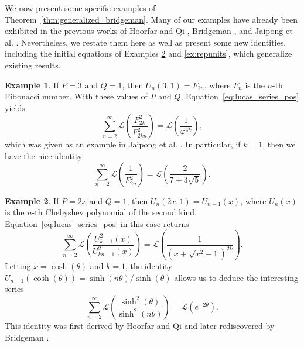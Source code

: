 \documentclass[10pt]{article}
\theoremstyle{definition}
\newtheorem{example}{Example}
\begin{document}
We now present some specific examples of Theorem~\ref{thm:generalized_bridgeman}.  Many of our examples have already been exhibited in the previous works of Hoorfar and Qi \cite{hoorfar2009sums}, Bridgeman \cite{bridgeman2021dilogarithm}, and Jaipong et al. \cite{jaipong2023}.  Nevertheless, we restate them here as well as present some new identities, including the initial equations of Examples \ref{ex:chebyshev} and \ref{ex:repunits}, which generalize existing results. 
\begin{example}\label{ex:lucas_pos_fib}
If $P=3$ and $Q=1$, then $U_n(3,1) = F_{2n}$, where $F_{n}$ is the $n$-th Fibonacci number.  With these values of $P$ and $Q$, Equation~\eqref{eq:lucas_series_pos} yields
\begin{equation*}
    \sum_{n=2}^{\infty}\mathcal{L}\left(\frac{F^2_{2k}}{F^2_{2kn}}\right)  = \mathcal{L}\left(\frac{1}{\varphi^{4k}}\right),
\end{equation*}
which was given as an example in Jaipong et al. \cite{jaipong2023}.  In particular, if $k = 1$, then we have the nice identity
\begin{equation*}
    \sum_{n=2}^{\infty}\mathcal{L}\left(\frac{1}{F^2_{2n}}\right)  = \mathcal{L}\left(\frac{2}{7+3\sqrt{5}}\right).
\end{equation*}
\end{example}
\begin{example}\label{ex:chebyshev}
If $P=2x$ and $Q=1$, then $U_n(2x,1) = U_{n-1}(x)$, where $U_{n}(x)$ is the $n$-th Chebyshev polynomial of the second kind.  Equation~\eqref{eq:lucas_series_pos} in this case returns
\begin{equation*}
    \sum_{n=2}^{\infty}\mathcal{L}\left(\frac{U^2_{k-1}(x)}{U^2_{kn-1}(x)}\right)  = \mathcal{L}\left(\frac{1}{(x+\sqrt{x^2-1})^{2k}}\right).
\end{equation*}
Letting $x = \cosh(\theta)$ and $k=1$, the identity $U_{n-1}(\cosh(\theta)) = \sinh(n \theta) / \sinh(\theta)$ allows us to deduce the interesting series 
\begin{equation*}
    \sum_{n=2}^{\infty}\mathcal{L}\left(\frac{\sinh^2(\theta)}{\sinh^2(n \theta)}\right)  = \mathcal{L}\left(e^{-2\theta}\right).
\end{equation*}
This identity was first derived by Hoorfar and Qi \cite{hoorfar2009sums} and later rediscovered by Bridgeman \cite{bridgeman2021dilogarithm}.
\end{example}
\end{document}
